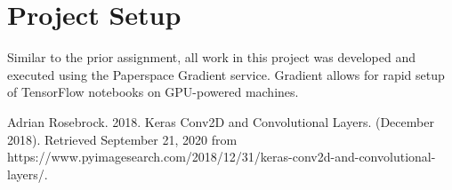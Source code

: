 \documentclass{article}
\begin{document}
  
  \graphicspath{{./images/}}

\section{Project Setup}
\par Similar to the prior assignment, all work in this project was developed and executed using the Paperspace Gradient service.
Gradient allows for rapid setup of TensorFlow notebooks on GPU-powered machines.


\begin{appendices}

% 
\end{appendices}

\begin{thebibliography}{9}
  Adrian Rosebrock. 2018. Keras Conv2D and Convolutional Layers. (December 2018). Retrieved September 21, 2020 from https://www.pyimagesearch.com/2018/12/31/keras-conv2d-and-convolutional-layers/.
  
  \end{thebibliography}
\end{document}
